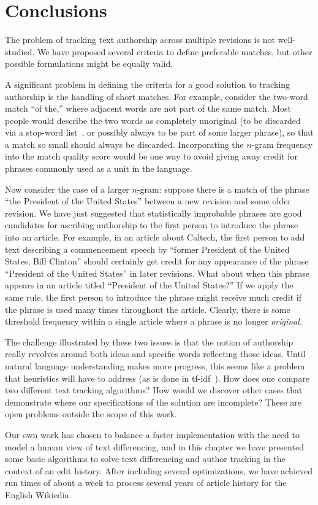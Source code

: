 \section{Conclusions}

The problem of tracking text authorship across multiple revisions
is not well-studied.
We have proposed several criteria to define preferable matches,
but other possible formulations
might be equally valid.

A significant problem in defining the criteria for a
good solution to tracking authorship is the handling of short matches.
For example, consider the two-word match ``of the,'' where adjacent
words are not part of the same match.
Most people would describe the two words as completely
unoriginal (to be discarded via a stop-word list~\cite{Kinzler2011},
or possibly always to be part of some larger phrase),
so that a match so small should always be discarded.
Incorporating the $n$-gram frequency into the match quality
score would be one way to avoid giving away credit for phrases
commonly used as a unit in the language.

Now consider the case of a larger $n$-gram: suppose there is a match
of the phrase ``the President of the United States'' between a new
revision and some older revision.
We have just suggested that statistically improbable phrases are
good candidates for ascribing authorship to the first person to
introduce the phrase into an article.
For example, in an article about Caltech, the first person to
add text describing a commencement speech by ``former President of
the United States, Bill Clinton'' should certainly get credit for
any appearance of the phrase ``President of the United States''
in later revisions.
What about when this phrase appears in an article titled
``President of the United States?''
If we apply the same rule, the first person to introduce the phrase
might receive much credit if the phrase is used many times throughout
the article.
Clearly, there is some threshold frequency within a single
article where a phrase is no longer \textit{original}.

The challenge illustrated by these two issues is that the notion
of authorship really revolves around both ideas and specific
words reflecting those ideas.
Until natural language understanding makes more progress, this seems
like a problem that heuristics will have to address
(\eg as is done in tf-idf~\cite{Jones1972}).
How does one compare two different text tracking algorithms?
How would we discover other cases that demonstrate where our
specifications of the solution are incomplete?
These are open problems outside the scope of this work.

Our own work has chosen to balance a faster implementation with the
need to model a human view of text differencing, and
in this chapter we have presented some basic algorithms to solve text
differencing and author tracking in the context of an edit history.
After including several optimizations, we have achieved run times
of about a week to process several years of article history for
the English Wikiedia.

